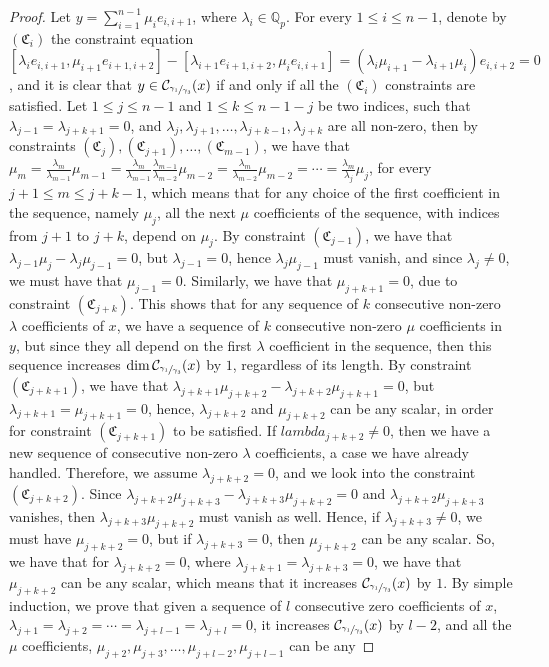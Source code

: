 \documentclass[12pt]{article}
\begin{document}
\begin{proof}
Let $y=\sum_{i=1}^{n-1}\mu_i e_{i,i+1}$, where $\lambda_i\in\mathbb{Q}_p$.
For every $1\leq i\leq n-1$, denote by $(\mathfrak{C}_i)$ the constraint equation $[\lambda_i e_{i,i+1},\mu_{i+1}e_{i+1,i+2}]-[\lambda_{i+1}e_{i+1,i+2},\mu_i e_{i,i+1}]=(\lambda_i\mu_{i+1}-\lambda_{i+1}\mu_i)e_{i,i+2}=0$, and it is clear that $y\in\mathcal{C}_{\sfrac{\gamma_1}{\gamma_3}}(x)$ if and only if all the $(\mathfrak{C}_i)$ constraints are satisfied. Let $1\leq j\leq n-1$ and $1\leq k\leq n-1-j$ be two indices, such that $\lambda_{j-1}=\lambda_{j+k+1}=0$, and $\lambda_j,\lambda_{j+1},\dots,\lambda_{j+k-1},\lambda_{j+k}$ are all non-zero, then by constraints $(\mathfrak{C}_j),(\mathfrak{C}_{j+1}),\dots,(\mathfrak{C}_{m-1})$, we have that $\mu_m=\frac{\lambda_m}{\lambda_{m-1}}\mu_{m-1}=\frac{\lambda_m}{\lambda_{m-1}}\frac{\lambda_{m-1}}{\lambda_{m-2}}\mu_{m-2}=\frac{\lambda_m}{\lambda_{m-2}}\mu_{m-2}=\cdots=\frac{\lambda_m}{\lambda_j}\mu_j$, for every $j+1\leq m\leq j+k-1$, which means that for any choice of the first coefficient in the sequence, namely $\mu_j$, all the next $\mu$ coefficients of the sequence, with indices from $j+1$ to $j+k$, depend on $\mu_j$. By constraint $(\mathfrak{C}_{j-1})$, we have that $\lambda_{j-1}\mu_j-\lambda_j\mu_{j-1}=0$, but $\lambda_{j-1}=0$, hence $\lambda_j\mu_{j-1}$ must vanish, and since $\lambda_j\neq 0$, we must have that $\mu_{j-1}=0$. Similarly, we have that $\mu_{j+k+1}=0$, due to constraint $(\mathfrak{C}_{j+k})$. This shows that for any sequence of $k$ consecutive non-zero $\lambda$ coefficients of $x$, we have a sequence of $k$ consecutive non-zero $\mu$ coefficients in $y$, but since they all depend on the first $\lambda$ coefficient in the sequence, then this sequence increases $\dim\mathcal{C}_{\sfrac{\gamma_1}{\gamma_3}}(x)$ by $1$, regardless of its length. By constraint $(\mathfrak{C}_{j+k+1})$, we have that $\lambda_{j+k+1}\mu_{j+k+2}-\lambda_{j+k+2}\mu_{j+k+1}=0$, but $\lambda_{j+k+1}=\mu_{j+k+1}=0$, hence, $\lambda_{j+k+2}$ and $\mu_{j+k+2}$ can be any scalar, in order for constraint $(\mathfrak{C}_{j+k+1})$ to be satisfied. If $lambda_{j+k+2}\neq 0$, then we have a new sequence of consecutive non-zero $\lambda$ coefficients, a case we have already handled. Therefore, we assume $\lambda_{j+k+2}=0$, and we look into the constraint $(\mathfrak{C}_{j+k+2})$. Since $\lambda_{j+k+2}\mu_{j+k+3}-\lambda_{j+k+3}\mu_{j+k+2}=0$ and $\lambda_{j+k+2}\mu_{j+k+3}$ vanishes, then                                                                                 $\lambda_{j+k+3}\mu_{j+k+2}$ must vanish as well. Hence, if $\lambda_{j+k+3}\neq 0$, we must have $\mu_{j+k+2}=0$, but if $\lambda_{j+k+3}=0$, then $\mu_{j+k+2}$ can be any scalar. So, we have that for $\lambda_{j+k+2}=0$, where $\lambda_{j+k+1}=\lambda_{j+k+3}=0$, we have that $\mu_{j+k+2}$ can be any scalar, which means that it increases $\mathcal{C}_{\sfrac{\gamma_1}{\gamma_3}}(x)$ by $1$. By simple induction, we prove that given a sequence of $l$ consecutive zero coefficients of $x$, $\lambda_{j+1}=\lambda_{j+2}=\cdots=\lambda_{j+l-1}=\lambda_{j+l}=0$, it increases $\mathcal{C}_{\sfrac{\gamma_1}{\gamma_3}}(x)$ by $l-2$, and all the $\mu$ coefficients, $\mu_{j+2},\mu_{j+3},\dots,\mu_{j+l-2},\mu_{j+l-1}$ can be any 
\end{proof}
\end{document}
